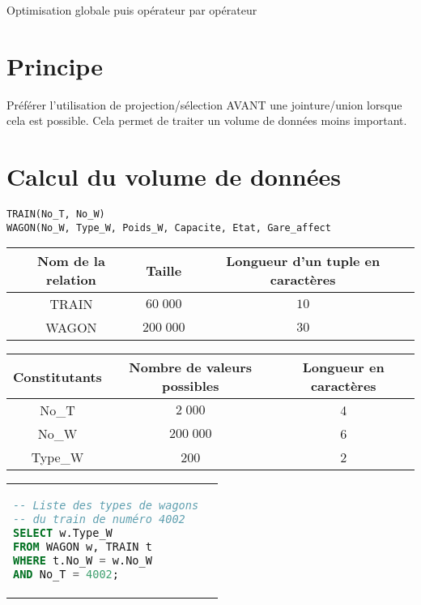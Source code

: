 \documentclass[12pt,a4paper,openany]{book}
\begin{document}
Optimisation globale puis opérateur par opérateur

\section{Principe}
Préférer  l'utilisation  de  projection/sélection  AVANT  une  jointure/union  lorsque  cela  est 
possible. Cela permet de traiter un volume de données moins important.  

\section{Calcul du volume de données}
\begin{lstlisting}
TRAIN(No_T, No_W)
WAGON(No_W, Type_W, Poids_W, Capacite, Etat, Gare_affect
\end{lstlisting}
\begin{tabular}{ccc}
	\textbf{Nom de la relation} & \textbf{Taille} & \textbf{Longueur d'un tuple en caractères}\\
	\hline
	TRAIN & $60\;000$& $10$\\
	\hline
	WAGON & $200\;000$ & $30$\\
	\hline
\end{tabular}

\begin{tabular}{ccc}
	Constitutants & Nombre de valeurs possibles & Longueur en caractères\\
	\hline
	No\_T &$2\;000$ & 4\\
	\hline
	No\_W &$200\;000$& 6\\
	\hline
	Type\_W & 200 & 2\\
	\hline
\end{tabular}

\begin{tabular}{ll}
	\begin{minipage}{0.4\textwidth} 
		\begin{lstlisting}[linewidth=180px, language=SQL]
-- Liste des types de wagons
-- du train de numéro 4002
SELECT w.Type_W
FROM WAGON w, TRAIN t
WHERE t.No_W = w.No_W
AND No_T = 4002;
\end{lstlisting}
	\end{minipage}
	&
	\begin{minipage}{0.7\textwidth} 
	\end{minipage}

\end{tabular}
\end{document}
